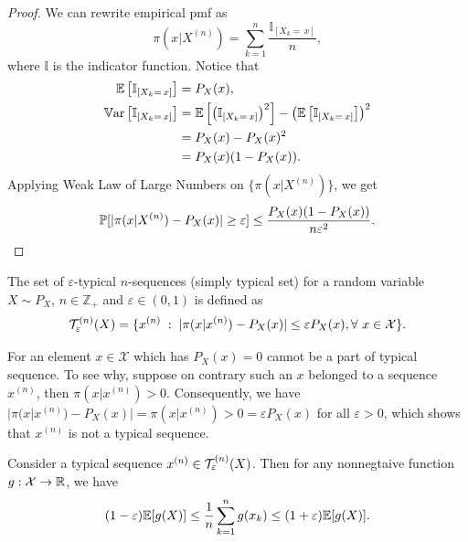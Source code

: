\documentclass[11pt,a4paper]{article}
\begin{document}
\begin{proof}
    We can rewrite empirical pmf as 
    \begin{equation*}
        \pi(x|X^{(n)}) = \sum_{k=1}^{n} \dfrac{\mathbb{I}_{[X_k =\, x]}}{n}, 
    \end{equation*}
    where $\mathbb{I}$ is the indicator function. Notice that
    \begin{align*}
        \mathbb{E}\left[\mathbb{I}_{[X_k =\, x]}\right] &= P_X(x), \\
        \mathbb{V}\text{ar}\left[ \mathbb{I}_{[X_k =\, x]} \right] &= \mathbb{E}\left[\left( \mathbb{I}_{[X_k =\, x]} \right)^2\right] - \left(\mathbb{E}\left[\mathbb{I}_{[X_k =\, x]}\right]\right)^2 \\
        &= P_X(x) - P_X(x)^2 \\ 
        &= P_X(x)(1-P_X(x)).
    \end{align*}
    Applying Weak Law of Large Numbers on $\{\pi(x|X^{(n)})\}$, we get 
    \begin{equation*}
        \mathbb{P}[|\pi(x|X^{(n)}) - P_X(x)|\ge \varepsilon] \le \dfrac{P_X(x)(1-P_X(x))}{n\varepsilon^2}.
    \end{equation*}
\end{proof}

\begin{definition}
    The {set of $\varepsilon$-typical $n$-sequences} (simply typical set) for a random variable $X\sim P_X$, $n\in\mathbb{Z}_+$ and $\varepsilon \in (0,1)$ is defined as
    \begin{equation*}
        \mathcal{T}^{(n)}_\varepsilon (X) = \{x^{(n)}\;:\; |\pi(x|x^{(n)}) - P_X(x)| \le \varepsilon P_X(x), \forall\ x\in\mathcal{X}\}.
    \end{equation*}
\end{definition}

\begin{remark}
    For an element $x\in\mathcal{X}$ which has $P_X(x) = 0$ cannot be a part of typical sequence. To see why, suppose on contrary such an $x$ belonged to a sequence $x^{(n)}$, then $\pi(x|x^{(n)}) > 0$. Consequently, we have $|\pi(x|x^{(n)}) - P_X(x)| = \pi(x|x^{(n)}) > 0 = \varepsilon P_X(x)$ for all $\varepsilon > 0$, which shows that $x^{(n)}$ is not a typical sequence.
\end{remark}

\begin{lemma}
    Consider a typical sequence $x^{(n)}\in \mathcal{T}^{(n)}_\varepsilon (X)$. Then for any {nonnegtaive} function $g:\mathcal{X}\rightarrow \mathbb{R}$, we have 
    \begin{equation*}
        (1-\varepsilon) \mathbb{E}[g(X)] \le \dfrac{1}{n} \sum_{k=1}^{n} g(x_k) \le (1+\varepsilon) \mathbb{E}[g(X)].
    \end{equation*}
\end{lemma}
\end{document}
